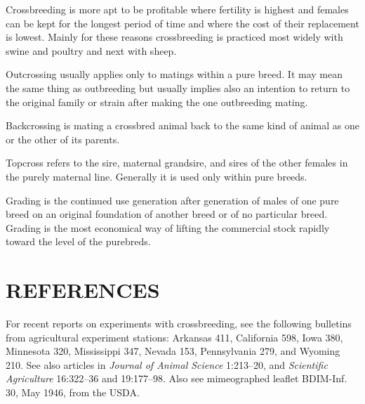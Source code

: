Crossbreeding is more apt to be profitable where fertility is highest
and females can be kept for the longest period of time and where the
cost of their replacement is lowest. Mainly for these reasons crossbreeding
is practiced most widely with swine and poultry and next with
sheep.

Outcrossing usually applies only to matings within a pure breed. It
may mean the same thing as outbreeding but usually implies also an
intention to return to the original family or strain after making the one
outbreeding mating.

Backcrossing is mating a crossbred animal back to the same kind of
animal as one or the other of its parents.

Topcross refers to the sire, maternal grandsire, and sires of the other
females in the purely maternal line. Generally it is used only within
pure breeds.

Grading is the continued use generation after generation of males
of one pure breed on an original foundation of another breed or of no
particular breed. Grading is the most economical way of lifting the
commercial stock rapidly toward the level of the purebreds.

\section*{REFERENCES}

For recent reports on experiments with crossbreeding, see the following
bulletins from agricultural experiment stations: Arkansas 411,
California 598, Iowa 380, Minnesota 320, Mississippi 347, Nevada 153,
Pennsylvania 279, and Wyoming 210. See also articles in \textit{Journal of
Animal Science} 1:213--20, and \textit{Scientific Agriculture} 16:322--36 and
19:177--98. Also see mimeographed leaflet BDIM-Inf. 30, May 1946,
from the USDA.
